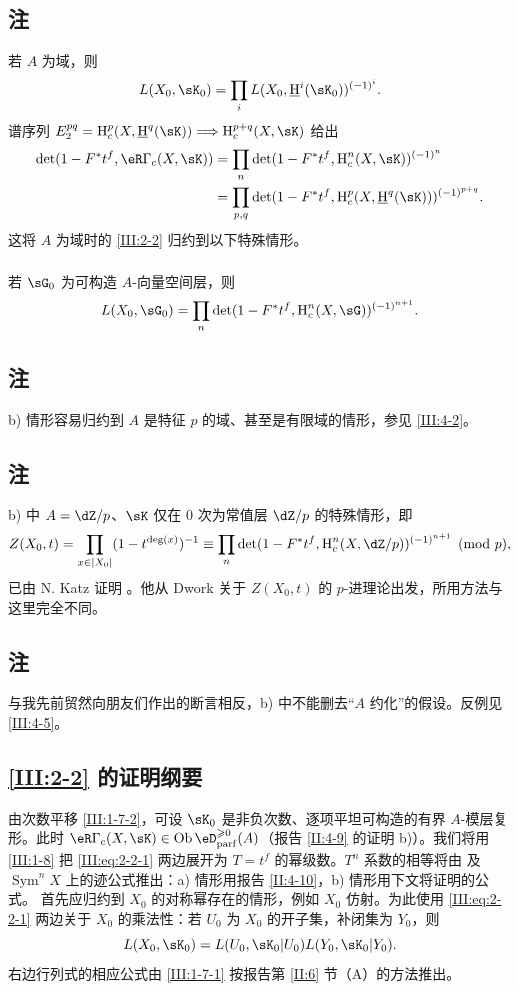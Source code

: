 \subsection{注}\label{III:2-4}
若 $A$ 为域，则
\[L(X_0,\sK_0)=\prod_iL(X_0,\underline\h^i(\sK_0))^{(-1)^i}.\]
谱序列 $E_2^{pq}=\h_c^p(X,\underline\h^q(\sK))\Longrightarrow\h_c^{p+q}(X,\sK)$ 给出
\begin{align*}
\det(1-F^*t^f,\eR\Gamma_c(X,\sK))
&=\prod_n\det(1-F^*t^f,\h_c^n(X,\sK))^{(-1)^n}\\
&=\prod_{p,q}\det(1-F^*t^f,\h_c^p(X,\underline\h^q(\sK)))^{(-1)^{p+q}}.
\end{align*}
这将 $A$ 为域时的 \ref{III:2-2} 归约到以下特殊情形。
\subsubsection{}\label{III:2-4-1}
若 $\sG_0$ 为可构造 $A$-向量空间层，则
\[L(X_0,\sG_0)=\prod_n\det(1-F^*t^f,\h_c^n(X,\sG))^{(-1)^{n+1}}.\]

\subsection{注}\label{III:2-5}
b) 情形容易归约到 $A$ 是特征 $p$ 的域、甚至是有限域的情形，参见 \ref{III:4-2}。
\subsection{注}\label{III:2-6}
b) 中 $A=\dZ/p$、$\sK$ 仅在 $0$ 次为常值层 $\dZ/p$ 的特殊情形，即
\[Z(X_0,t)=\prod_{x\in|X_0|}(1-t^{\deg(x)})^{-1}
\equiv\prod_n\det(1-F^*t^f,\h_c^n(X,\dZ/p))^{(-1)^{n+1}}\pmod p,\]
已由 N. Katz 证明 \cite[XXII 3.1]{sga7}。他从 Dwork 关于 $Z(X_0,t)$ 的 $p$-进理论出发，所用方法与这里完全不同。
\subsection{注}\label{III:2-7}
与我先前贸然向朋友们作出的断言相反，b) 中不能删去“$A$ 约化”的假设。反例见 \ref{III:4-5}。

\subsection{\texorpdfstring{\ref{III:2-2}}{2.2} 的证明纲要}\label{III:2-8}
由次数平移 \ref{III:1-7-2}，可设 $\sK_0$ 是非负次数、逐项平坦可构造的有界 $A$-模层复形。此时 $\eR\Gamma_c(X,\sK)\in\ob\eD_{\mathrm{parf}}^{\geqslant0}(A)$（报告 \ref{II:4-9} 的证明 b)）。我们将用 \ref{III:1-8} 把 \eqref{III:eq:2-2-1} 两边展开为 $T=t^f$ 的幂级数。$T^n$ 系数的相等将由 \cite[XVII 5.5.21]{sga4} 及 $\operatorname{Sym}^nX$ 上的迹公式推出：a) 情形用报告 \ref{II:4-10}，b) 情形用下文将证明的公式。
首先应归约到 $X_0$ 的对称幂存在的情形，例如 $X_0$ 仿射。为此使用 \eqref{III:eq:2-2-1} 两边关于 $X_0$ 的乘法性：若 $U_0$ 为 $X_0$ 的开子集，补闭集为 $Y_0$，则
\[L(X_0,\sK_0)=L(U_0,\sK_0|U_0)L(Y_0,\sK_0|Y_0).\]
右边行列式的相应公式由 \ref{III:1-7-1} 按报告第 \ref{II:6} 节（A）的方法推出。

